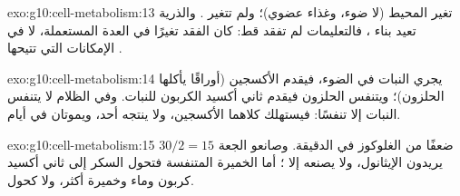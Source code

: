 \begin{solution}{exo:g10:cell-metabolism:13}
تغير المحيط (لا ضوء، وغذاء عضوي)؛ ولم تتغير . والذرية تعيد
بناء ، فالتعليمات لم تفقد قط: كان الفقد تغيرًا في
العدة المستعملة، لا في الإمكانات التي تتيحها .
\end{solution}

\begin{solution}{exo:g10:cell-metabolism:14}
يجري النبات  في الضوء، فيقدم الأكسجين 
(أوراقًا يأكلها الحلزون)؛ ويتنفس الحلزون فيقدم ثاني أكسيد الكربون
للنبات. وفي الظلام لا يتنفس النبات إلا تنفسًا: فيستهلك كلاهما
الأكسجين، ولا ينتجه أحد، ويموتان في أيام.
\end{solution}

\begin{solution}{exo:g10:cell-metabolism:15}
$30/2 = 15$ ضعفًا من الغلوكوز في الدقيقة. وصانعو الجعة يريدون
الإيثانول، ولا يصنعه إلا ؛ أما الخميرة المتنفسة فتحول السكر إلى
ثاني أكسيد كربون وماء وخميرة أكثر، ولا كحول.
\end{solution}

